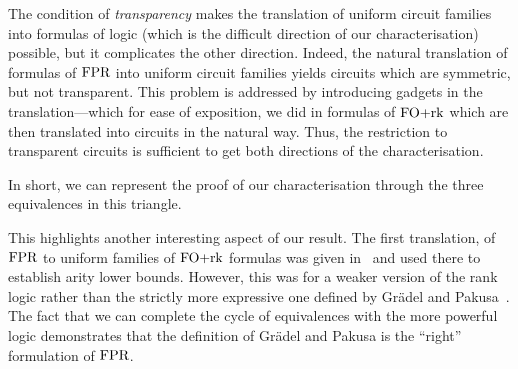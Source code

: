 \documentclass[a4paper,UKenglish]{lipics-v2018}
\begin{document}

The condition of \emph{transparency} makes the translation of uniform circuit
families into formulas of logic (which is the difficult direction of our
characterisation) possible, but it complicates the other direction. Indeed, the
natural translation of formulas of $\text{\upshape FPR}$ into uniform circuit families yields
circuits which are symmetric, but not transparent. This problem is addressed by
introducing gadgets in the translation---which for ease of exposition, we did in
formulas of $\text{\upshape FO+rk}$ which are then translated into circuits in the natural way.
Thus, the restriction to transparent circuits is sufficient to get both
directions of the characterisation.

In short, we can represent the proof of our characterisation through the three
equivalences in this triangle.

\begin{center}
\end{center}

This highlights another interesting aspect of our result. The first translation,
of $\text{\upshape FPR}$ to uniform families of $\text{\upshape FO+rk}$ formulas was given
in~\cite{Dawar09logicswith} and used there to establish arity lower bounds.
However, this was for a weaker version of the rank logic rather than the
strictly more expressive one defined by Gr\"{a}del and Pakusa~\cite{GradelP15a}.
The fact that we can complete the cycle of equivalences with the more powerful
logic demonstrates that the definition of Gr\"{a}del and Pakusa is the ``right''
formulation of $\text{\upshape FPR}$.
\end{document}

